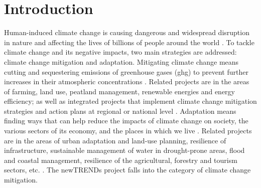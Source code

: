 \chapter{Introduction}

Human-induced climate change is causing dangerous and widespread disruption in nature and affecting the lives of billions of people around the world \cite{ipcc}. 
To tackle climate change and its negative impacts, two main strategies are addressed: climate change mitigation and adaptation. 
Mitigating climate change means cutting and sequestering emissions of greenhouse gases (\gls{ghg}) to prevent further increases in their atmospheric concentrations \cite{handbook}. 
Related projects are in the areas of farming, land use, peatland management, renewable energies and energy efficiency; as well as integrated projects that implement climate change mitigation strategies and action plans at regional or national level \cite{ec}. 
Adaptation means finding ways that can help reduce the impacts of climate change on society, the various sectors of its economy, and the places in which we live \cite{handbook}. 
Related projects are in the areas of urban adaptation and land-use planning, resilience of infrastructure, sustainable management of water in drought-prone areas, flood and coastal management, resilience of the agricultural, forestry and tourism sectors, etc. \cite{ec}.  
The newTRENDs project falls into the category of climate change mitigation. 




